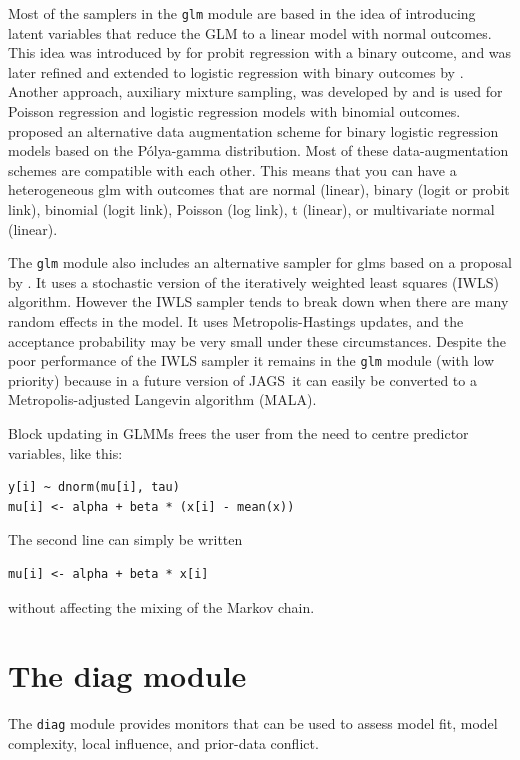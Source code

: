 \documentclass[11pt, a4paper, titlepage]{report}
\newcommand{\JAGS}{\textsf{JAGS}}
\begin{document}
{Most of the samplers in the \texttt{glm} module are based in the idea
of introducing latent variables that reduce the GLM to a linear model
with normal outcomes. This idea was introduced by \citet{AlbertChib93}
for probit regression with a binary outcome, and was later refined and
extended to logistic regression with binary outcomes by
\citet{HolmesHeld06}. Another approach, auxiliary mixture sampling,
was developed by \citet{Fruhwirth-Schnatter09} and is used for Poisson
regression and logistic regression models with binomial outcomes.
\citet{PolsonEtal2013} proposed an alternative data augmentation
scheme for binary logistic regression models based on the
P\'{o}lya-gamma distribution. Most of these data-augmentation schemes
are compatible with each other. This means that you can have a
heterogeneous glm with outcomes that are normal (linear), binary
(logit or probit link), binomial (logit link), Poisson (log link),
t (linear), or multivariate normal (linear).

The \texttt{glm} module also includes an alternative sampler for glms
based on a proposal by \citet{Gamerman97}. It uses a stochastic
version of the iteratively weighted least squares (IWLS)
algorithm. However the IWLS sampler tends to break down when there are
many random effects in the model. It uses Metropolis-Hastings updates,
and the acceptance probability may be very small under these
circumstances. Despite the poor performance of the IWLS sampler it
remains in the \texttt{glm} module (with low priority) because in a
future version of \JAGS\ it can easily be converted to a
Metropolis-adjusted Langevin algorithm (MALA).

Block updating in GLMMs frees the user from the need to centre
predictor variables, like this:
\begin{verbatim}
y[i] ~ dnorm(mu[i], tau)
mu[i] <- alpha + beta * (x[i] - mean(x))
\end{verbatim}
The second line can simply be written
\begin{verbatim}
mu[i] <- alpha + beta * x[i]
\end{verbatim}
without affecting the mixing of the Markov chain.  


\chapter{The diag module}
\label{chapter:diag}

The \texttt{diag} module provides monitors that can be used to assess
model fit, model complexity, local influence, and prior-data conflict.

}
\end{document}
